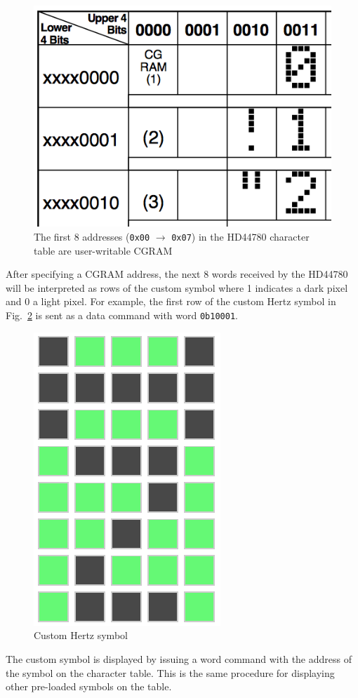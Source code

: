\begin{figure}[tbph]
  \centering
  \includegraphics[width=0.4\linewidth]{../graphics/char-table}
  \caption{The first 8 addresses (\texttt{0x00} $\rightarrow$ \texttt{0x07}) in the HD44780 character table are user-writable CGRAM~\cite[p. 17]{H:HD44780}}
  \label{fig:char-table}
\end{figure}

After specifying a CGRAM address, the next 8 words received by the HD44780 will be interpreted as rows of the custom symbol where 1 indicates a dark pixel and 0 a light pixel.
For example, the first row of the custom Hertz symbol in Fig.~\ref{fig:hzsymbol} is sent as a data command with word \texttt{0b10001}.

\begin{figure}[tbph]
  \centering
  \includegraphics[width=0.2\linewidth]{../graphics/hz_symbol}
  \caption{Custom Hertz symbol}
  \label{fig:hzsymbol}
\end{figure}

The custom symbol is displayed by issuing a word command with the address of the symbol on the character table.
This is the same procedure for displaying other pre-loaded symbols on the table.

